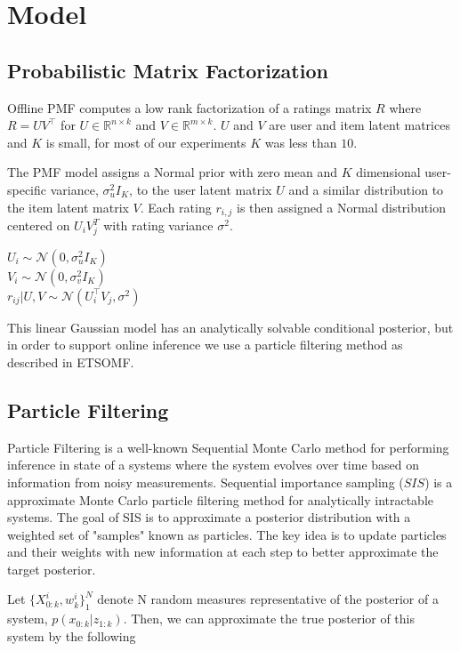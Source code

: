 \documentclass{article}
\begin{document}
\section{Model}

\subsection{Probabilistic Matrix Factorization}
Offline PMF computes a low rank factorization of a ratings matrix $R$ where $R = UV^\top$ for $U \in \mathbb{R}^{n \times k}$
and $V \in \mathbb{R}^{m \times k}$. $U$ and $V$ are user and item latent matrices and $K$ is small, for most of our experiments $K$ was less than $10$.

The PMF model assigns a Normal prior with zero mean and $K$ dimensional user-specific variance, $\sigma_u^2 I_K$, to the user latent matrix $U$ and a similar distribution to the item latent matrix $V$. Each rating $r_{i,j}$ is then assigned a Normal distribution centered on $U_iV_j^T$ with rating variance $\sigma^2$.

\begin{center}
$U_i \sim \mathcal{N}(0, \sigma_u^2 I_K)$ \\
$V_i \sim \mathcal{N}(0, \sigma_v^2 I_K)$ \\
$r_{ij} | U, V \sim \mathcal{N}(U_i^\top V_j, \sigma^2)$
\end{center}

This linear Gaussian model has an analytically solvable conditional posterior, but in order to support online inference we use a particle filtering method as described in ETSOMF.

\subsection{Particle Filtering}
Particle Filtering is a well-known Sequential Monte Carlo method for performing inference in state of a systems where the system evolves over time based on information from noisy measurements. Sequential importance sampling ($SIS$) is a approximate Monte Carlo particle filtering method for analytically intractable systems. The goal of SIS is to approximate a posterior distribution with a weighted set of "samples" known as particles. The key idea is to update particles and their weights with new information at each step to better approximate the target posterior.  

Let $\{X_{0:k}^i, w_k^i\}_1^N$ denote N random measures representative of the posterior of a system, $p(x_{0:k}| z_{1:k})$. Then, we can approximate the true posterior of this system by the following
\end{document}
